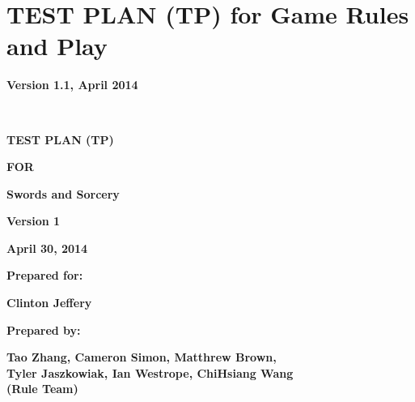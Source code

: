 \chapter{TEST PLAN (TP) for Game Rules and Play}

{\centering{}\bfseries\color{black}
Version 1.1, April 2014
\par}

\ 

\bigskip

{\centering\bfseries\color{black}
TEST PLAN (TP)}

{\centering{}\bfseries\color{black}
FOR
\par}


\bigskip

{\centering{}\bfseries\color{black}
Swords and Sorcery
\par}


\bigskip


\bigskip


\bigskip


\bigskip


\bigskip


\bigskip


\bigskip

{\centering{}\bfseries\color{black}
Version 1
\par}

{\centering{}\bfseries\color{black}
April 30, 2014
\par}


\bigskip


\bigskip

{\centering{}\bfseries\color{black}
Prepared for:
\par}

{\centering{}\bfseries\color{black}
Clinton Jeffery
\par}


\bigskip


\bigskip

{\centering{}\bfseries\color{black}
Prepared by:
\par}

{\centering{}\bfseries\color{black}
Tao Zhang, Cameron Simon, Matthrew Brown, \\Tyler Jaszkowiak, Ian Westrope, ChiHsiang Wang \\(Rule Team)
\par}

